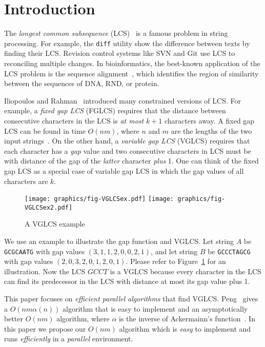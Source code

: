 \section{Introduction} %
\label{sec:Introduction}


The {\em longest common subsequence} (LCS)~\cite{Hirschberg1975ALS} is
a famous problem in string processing.  For example, the {\tt diff}
utility show the difference between texts by finding their LCS.
Revision control systems like SVN and Git use LCS to reconciling
multiple changes.  In bioinformatics, the best-known application of
the LCS problem is the sequence
alignment~\cite{mount2001bioinformatics, Ann2010EfficientAF}, which
identifies the region of similarity between the sequences of DNA, RND,
or protein.


Iliopoulos and Rahman~\cite{Rahman2006AlgorithmsFC} introduced many
constrained versions of LCS.  For example, a {\em fixed gap LCS}
(FGLCS) requires that the distance between consecutive characters in
the LCS is {\em at most} $k + 1$ characters away.  A fixed gap LCS can
be found in time $O(nm)$, where $n$ and $m$ are the lengths of the two
input strings~\cite{citation}.  On the other hand, a {\em variable gap
  LCS} (VGLCS) requires that each character has a {\em gap} value and
two consecutive characters in LCS must be with distance of the gap of
the {\em latter} character {\em plus} 1.  One can think of the fixed
gap LCS as a special case of variable gap LCS in which the gap values
of all characters are $k$.

\begin{figure}[!thb]
  \centering
  \texttt{[image: graphics/fig-VGLCSex.pdf]}
  \texttt{[image: graphics/fig-VGLCSex2.pdf]}
  \caption{A VGLCS example} \label{fig:VGLCSex}
\end{figure}

We use an example to illustrate the gap function and VGLCS.  Let string
$A$ be {\tt GCGCAATG} with gap values $(3, 1, 1, 2, 0, 0, 2, 1)$, and
let string $B$ be {\tt GCCCTAGCG} with gap values $(2, 0, 3, 2, 0, 1,
2, 0, 1)$.  Please refer to Figure~\ref{fig:VGLCSex} for an
illustration.  Now the LCS $GCCT$ is a VGLCS because every character
in the LCS can find its predecessor in the LCS with distance at most
its gap value plus 1.

This paper focuses on {\em efficient parallel algorithms} that find
VGLCS.  Peng~\cite{Peng2011TheLC} gives a $O(nm \alpha(n))$ algorithm
that is easy to implement and an asymptotically better $O(nm)$
algorithm, where $\alpha$ is the inverse of Ackermainn's
function~\cite{Banachowski1980ACT}.  In this paper we propose our
$O(nm)$ algorithm which is {\em easy} to implement and runs {\em
  efficiently} in a {\em parallel} environment.

